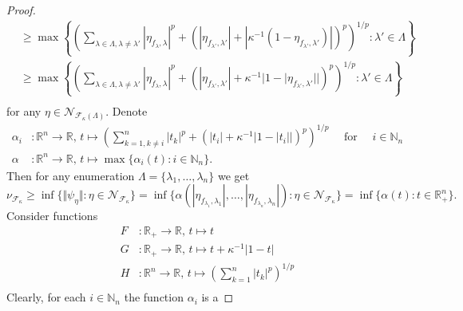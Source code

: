 \documentclass[12pt]{article}
\begin{document}
\begin{proof}
\[\begin{aligned}
        &\geq\max\left\{
            \left(
                \sum_{\lambda\in\Lambda,\lambda\neq \lambda'}
                    |\eta_{f_\lambda,\lambda}|^p+
                    (
                        |\eta_{f_{\lambda'},\lambda'}|+
                        |\kappa^{-1}(1-\eta_{f_{\lambda'},\lambda'})|
                    )^p
            \right)^{1/p}:
            \lambda'\in\Lambda
        \right\} \\
        &\geq\max\left\{
            \left(
                \sum_{\lambda\in\Lambda,\lambda\neq \lambda'} 
                    |\eta_{f_\lambda,\lambda}|^p+
                    (
                        |\eta_{f_{\lambda'},\lambda'}|+
                        \kappa^{-1}|1-|\eta_{f_{\lambda'},\lambda'}||
                    )^p
            \right)^{1/p}:
            \lambda'\in\Lambda
        \right\} \\
    \end{aligned}
    \]
    for any $\eta\in\mathcal{N}_{\mathcal{F}_{\kappa}(\Lambda)}$. Denote
    \[
    \begin{aligned}
        \alpha_i&:\mathbb{R}^n\to\mathbb{R},\,
        t\mapsto \left(
            \sum_{k=1,k\neq i}^n |t_k|^p+(|t_i|+\kappa^{-1}|1-|t_i||)^p
        \right)^{1/p} \quad\mbox{ for }\quad i\in\mathbb{N}_n \\
        \alpha&:\mathbb{R}^n\to\mathbb{R},\,
        t\mapsto\max\{\alpha_i(t):i\in\mathbb{N}_n\}.
    \end{aligned}
    \]
    Then for any enumeration $\Lambda=\{\lambda_1,\ldots,\lambda_n\}$ we get
    \[
        \nu_{\mathcal{F}_{\kappa}}
        \geq\inf\{
            \Vert \psi_{\eta}\Vert : \eta\in\mathcal{N}_{\mathcal{F}_{\kappa}}
        \}
        =\inf\{
            \alpha(
                |\eta_{f_{\lambda_1},\lambda_1}|,
                \ldots,
                |\eta_{f_{\lambda_n},\lambda_n}|
            ) : 
            \eta\in\mathcal{N}_{\mathcal{F}_{\kappa}}
        \}
        =\inf\{\alpha(t) : t\in\mathbb{R}_+^n\}.
    \]
    Consider functions
    \[
    \begin{aligned}
        F&:\mathbb{R}_+\to\mathbb{R},\, 
            t\mapsto t \\
        G&:\mathbb{R}_+\to\mathbb{R},\, 
            t\mapsto t+\kappa^{-1}|1-t| \\
        H&:\mathbb{R}^n\to\mathbb{R},\, t\mapsto 
            \left(\sum_{k=1}^n|t_k|^p\right)^{1/p} \\
    \end{aligned}
    \]
    Clearly, for each $i\in\mathbb{N}_n$ the function $\alpha_i$ is a 

\end{proof}
\end{document}
